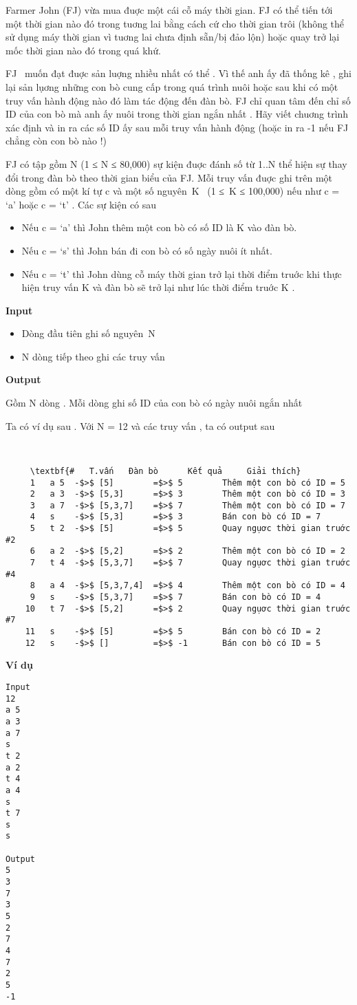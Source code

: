 

Farmer John (FJ) vừa mua đuợc một cái cỗ máy thời gian. FJ có thể tiến tới một thời gian nào đó trong tuơng lai bằng cách cứ cho thời gian trôi (không thể sử dụng máy thời gian vì tuơng lai chưa định sẵn/bị đảo lộn) hoặc quay trở lại mốc thời gian nào đó trong quá khứ.

FJ  muốn đạt đuợc sản luợng nhiều nhất có thể . Vì thế anh ấy đã thống kê , ghi lại sản lụơng những con bò cung cấp trong quá trình nuôi hoặc sau khi có một truy vấn hành động nào đó làm tác động đến đàn bò. FJ chỉ quan tâm đến chỉ số ID của con bò mà anh ấy nuôi trong thời gian ngắn nhất . Hãy viết chuơng trình xác định và in ra các số ID ấy sau mỗi truy vấn hành động (hoặc in ra -1 nếu FJ chẳng còn con bò nào !)

FJ có tập gồm N (1 ≤ N ≤ 80,000) sự kiện đuợc đánh số từ 1..N thể hiện sự thay đổi trong đàn bò theo thời gian biểu của FJ. Mỗi truy vấn đuợc ghi trên một dòng gồm có một kí tự c và một số nguyên K  (1 ≤ K ≤ 100,000) nếu như c = ‘a’ hoặc c = ‘t’ . Các sự kiện có sau
\begin{itemize}
	\item Nếu c = ‘a’ thì John thêm một con bò có số ID là K vào đàn bò.
	\item Nếu c = ‘s’ thì John bán đi con bò có số ngày nuôi ít nhất.
	\item Nếu c = ‘t’ thì John dùng cỗ máy thời gian trở lại thời điểm truớc khi thực hiện truy vấn K và đàn bò sẽ trở lại như lúc thời điểm truớc K .
\end{itemize}

\textbf{Input }
\begin{itemize}
	\item Dòng đầu tiên ghi số nguyên N
	\item N dòng tiếp theo ghi các truy vấn
\end{itemize}

\textbf{Output }

Gồm N dòng . Mỗi dòng ghi số ID của con bò có ngày nuôi ngắn nhất \textbf{}

Ta có ví dụ sau . Với N = 12 và các truy vấn , ta có output sau

 
\begin{verbatim}
     \textbf{#   T.vấn   Đàn bò      Kết quả     Giải thích}
     1   a 5  -$>$ [5]        =$>$ 5        Thêm một con bò có ID = 5
     2   a 3  -$>$ [5,3]      =$>$ 3        Thêm một con bò có ID = 3
     3   a 7  -$>$ [5,3,7]    =$>$ 7        Thêm một con bò có ID = 7
     4   s    -$>$ [5,3]      =$>$ 3        Bán con bò có ID = 7
     5   t 2  -$>$ [5]        =$>$ 5        Quay ngụơc thời gian truớc #2
     6   a 2  -$>$ [5,2]      =$>$ 2        Thêm một con bò có ID = 2
     7   t 4  -$>$ [5,3,7]    =$>$ 7        Quay ngụơc thời gian truớc #4
     8   a 4  -$>$ [5,3,7,4]  =$>$ 4        Thêm một con bò có ID = 4
     9   s    -$>$ [5,3,7]    =$>$ 7        Bán con bò có ID = 4
    10   t 7  -$>$ [5,2]      =$>$ 2        Quay ngụơc thời gian truớc #7
    11   s    -$>$ [5]        =$>$ 5        Bán con bò có ID = 2
    12   s    -$>$ []         =$>$ -1       Bán con bò có ID = 5\end{verbatim}

\textbf{Ví dụ}
\begin{verbatim}
Input
12
a 5
a 3
a 7
s
t 2
a 2
t 4
a 4
s
t 7
s
s

Output
5
3
7
3
5
2
7
4
7
2
5
-1\end{verbatim}